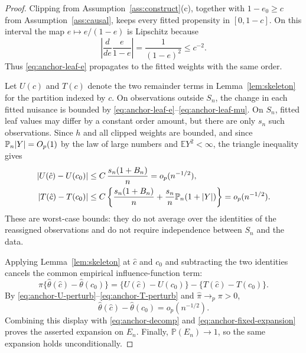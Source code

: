 \documentclass[11pt]{article}
\theoremstyle{plain}
\theoremstyle{definition}
\theoremstyle{remark}
\newcommand{\E}{\mathbb{E}}
\newcommand{\PP}{\mathbb{P}}
\newcommand{\Pn}{\mathbb{P}_n}
\newcommand{\ez}{e_0}
\newcommand{\thetahat}{\widehat{\theta}}
\newcommand{\pihat}{\widehat{\pi}}
\DeclarePairedDelimiter{\abs}{\lvert}{\rvert}
\begin{document}
\begin{proof}
Clipping from Assumption~\ref{ass:construct}(c), together with
$1-\ez\ge c$ from Assumption~\ref{ass:causal}, keeps every fitted propensity
in $[0,1-c]$. On this interval the map $e\mapsto e/(1-e)$ is Lipschitz because
\[
  \left\lvert
    \frac{d}{de}\frac{e}{1-e}
  \right\rvert
  =
  \frac{1}{(1-e)^2}
  \le c^{-2}.
\]
Thus \eqref{eq:anchor-leaf-e} propagates to the fitted weights with the same
order.

Let $U(c)$ and $T(c)$ denote the two remainder terms in
Lemma~\ref{lem:skeleton} for the partition indexed by $c$. On observations
outside $S_n$, the change in each fitted nuisance is bounded by
\eqref{eq:anchor-leaf-e}--\eqref{eq:anchor-leaf-mu}. On $S_n$, fitted leaf
values may differ by a constant order amount, but there are only $s_n$
such observations. Since $h$ and all clipped weights are bounded, and since
$\Pn\abs Y=O_p(1)$ by the law of large numbers and $\E Y^2<\infty$, the
triangle inequality gives
\begin{align}
  \abs{U(\hat c)-U(c_0)}
  &\le C\,\frac{s_n(1+B_n)}{n}
    =o_p(n^{-1/2}), \label{eq:anchor-U-perturb}\\
  \abs{T(\hat c)-T(c_0)}
  &\le
    C\left\{
      \frac{s_n(1+B_n)}{n}
      +\frac{s_n}{n}\Pn(1+\abs Y)
    \right\}
    =o_p(n^{-1/2}). \label{eq:anchor-T-perturb}
\end{align}
These are worst-case bounds: they do not average over the identities of the
reassigned observations and do not require independence between $S_n$ and
the data.

Applying Lemma~\ref{lem:skeleton} at $\hat c$ and $c_0$ and subtracting the
two identities cancels the common empirical influence-function term:
\[
  \pihat\bigl\{\thetahat(\hat c)-\thetahat(c_0)\bigr\}
  =
  \{U(\hat c)-U(c_0)\}
  -
  \{T(\hat c)-T(c_0)\}.
\]
By \eqref{eq:anchor-U-perturb}--\eqref{eq:anchor-T-perturb} and
$\pihat\to_p\pi>0$,
\[
  \thetahat(\hat c)-\thetahat(c_0)=o_p(n^{-1/2}).
\]
Combining this display with \eqref{eq:anchor-decomp} and
\eqref{eq:anchor-fixed-expansion} proves the asserted expansion on $E_n$.
Finally, $\PP(E_n)\to1$, so the same expansion holds unconditionally.
\end{proof}
\end{document}
